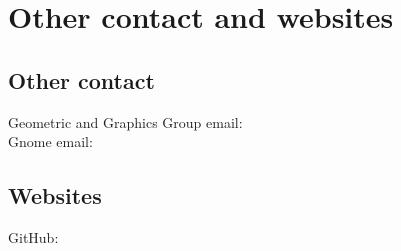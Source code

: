 \section{Other contact and websites}

    \subsection{Other contact}
        \begin{indentpar}{72pt}
            Geometric and Graphics Group email:  \\
            Gnome email: 
        \end{indentpar}
        
    \subsection{Websites}
        \begin{indentpar}{72pt}
            GitHub: 
        \end{indentpar}


